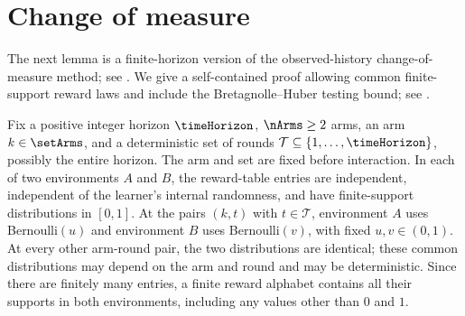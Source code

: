 %
\section{Change of measure}
\label{app:changeMeasureLem}
%
The next lemma is a finite-horizon version of the observed-history
change-of-measure method; see
\citet[Lemma~1 and Appendix~A]{Kaufmann16CBI}.
We give a self-contained proof allowing common finite-support reward
laws and include the Bretagnolle--Huber testing bound; see
\citet[Theorem~14.2]{Lattimore20BA}.

\begin{lemma}[\textcolor{titleTh}{Change of measure for observed transcripts}]
\label{l:transcriptChangeMeas}
Fix a positive integer horizon $\timeHorizon$, $\nArms\geq2$ arms,
an arm $k\in\setArms$, and a deterministic set of rounds
$\mathcal T\subseteq\{1,\ldots,\timeHorizon\}$, possibly the entire
horizon. The arm and set are fixed before interaction. In each of two
environments $A$ and $B$, the reward-table entries are independent,
independent of the learner's internal randomness, and have
finite-support distributions in $[0,1]$. At the pairs $(k,t)$ with
$t\in\mathcal T$, environment $A$ uses Bernoulli$(u)$ and environment
$B$ uses Bernoulli$(v)$, with fixed $u,v\in(0,1)$. At every other
arm-round pair, the two distributions are identical; these common
distributions may depend on the arm and round and may be deterministic.
Since there are finitely many entries, a finite reward alphabet
contains all their supports in both environments, including any
values other than $0$ and $1$.


\end{lemma}
